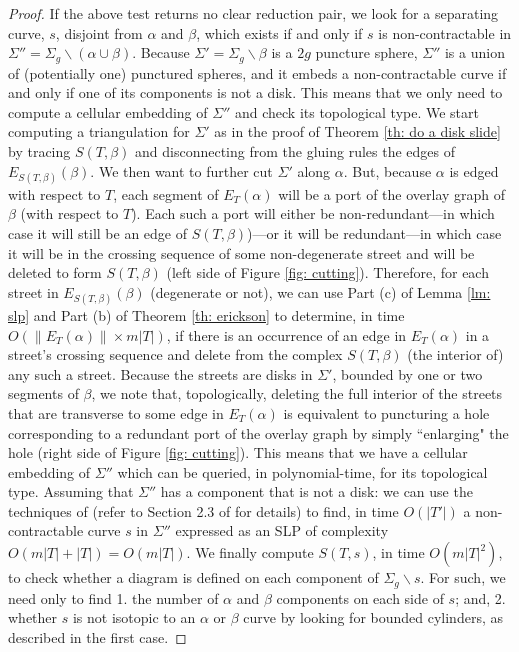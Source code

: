 \documentclass[11pt]{amsart}
\numberwithin{equation}{section}
\theoremstyle{plain}
\theoremstyle{definition}
\begin{document}
\begin{proof}
 If the above test returns no clear reduction pair, we look for a separating curve, $s$, disjoint from $\alpha$ and $\beta$, which exists if and only if $s$ is non-contractable in $\Sigma'' = \Sigma_g\backslash(\alpha\cup \beta)$. Because $\Sigma'=\Sigma_g\backslash \beta$ is a $2g$ puncture sphere, $\Sigma''$ is a union of (potentially one) punctured spheres, and it embeds a non-contractable curve if and only if one of its components is not a disk.
 This means that we only need to compute a cellular embedding of $\Sigma''$ and check its topological type. 
 We start computing a triangulation for $\Sigma'$ as in the proof of Theorem \ref{th: do a disk slide} by tracing $S(T,\beta)$ and disconnecting from the gluing rules the edges of $E_{S(T,\beta)}(\beta)$.
 We then want to further cut $\Sigma'$ along $\alpha$.
 But, because $\alpha$ is edged with respect to $T$, each segment of $E_T(\alpha)$ will be a port of the overlay graph of $\beta$ (with respect to $T$).
 Each such a port will either be non-redundant---in which case it will still be an edge of $S(T,\beta)$)---or it will be redundant---in which case it will be in the crossing sequence of some non-degenerate street and will be deleted to form $S(T,\beta)$ (left side of Figure \ref{fig: cutting}). 
 Therefore, for each street in $E_{S(T,\beta)}(\beta)$ (degenerate or not), we can use Part (c) of Lemma \ref{lm: slp} and Part (b) of Theorem \ref{th: erickson} to determine, in time $O(\|E_T(\alpha)\|\times m|T|)$, if there is an occurrence of an edge in $E_T(\alpha)$ in a street's crossing sequence and delete from the complex $S(T,\beta)$ (the interior of) any such a street. Because the streets are disks in $\Sigma'$, bounded by one or two segments of $\beta$, we note that, topologically, deleting the full interior of the streets that are transverse to some edge in $E_T(\alpha)$ is equivalent to puncturing a hole corresponding to a redundant port of the overlay graph by simply ``enlarging" the hole (right side of Figure \ref{fig: cutting}). This means that we have a cellular embedding of $\Sigma''$ which can be queried, in polynomial-time, for its topological type. Assuming that $\Sigma''$ has a component that is not a disk: we can use the techniques of \cite{erickson2002optimally} (refer to Section 2.3 of \cite{chambers2006splitting} for details) to find, in time $O(|T'|)$ a non-contractable curve $s$ in $\Sigma''$ expressed as an SLP of complexity $O(m|T|+|T|)=O(m|T|)$.
 We finally compute $S(T,s)$, in time $O(m|T|^2)$, to check whether a diagram is defined on each component of $\Sigma_g\backslash s$. 
 For such, we need only to find 1. the number of $\alpha$ and $\beta$ components on each side of $s$; and, 2. whether $s$ is not isotopic to an $\alpha$ or $\beta$ curve by looking for bounded cylinders, as described in the first case. 
\end{proof}
\end{document}
